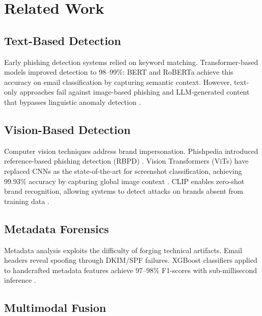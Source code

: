 \documentclass[conference]{IEEEtran}
\begin{document}
\section{Related Work}

\subsection{Text-Based Detection}

Early phishing detection systems relied on keyword matching. Transformer-based models improved detection to 98--99\%: BERT \cite{devlin_2019_bert} and RoBERTa \cite{liu_2019_roberta} achieve this accuracy on email classification by capturing semantic context. However, text-only approaches fail against image-based phishing and LLM-generated content that bypasses linguistic anomaly detection \cite{roy_2024_chatbots_phishbots}.

\subsection{Vision-Based Detection}

Computer vision techniques address brand impersonation. Phishpedia introduced reference-based phishing detection (RBPD) \cite{lin_2021_phishpedia}. Vision Transformers (ViTs) have replaced CNNs as the state-of-the-art for screenshot classification, achieving 99.93\% accuracy by capturing global image context \cite{dosovitskiy_2021_vit}. CLIP enables zero-shot brand recognition, allowing systems to detect attacks on brands absent from training data \cite{radford_2021_clip}.

\subsection{Metadata Forensics}

Metadata analysis exploits the difficulty of forging technical artifacts. Email headers reveal spoofing through DKIM/SPF failures. XGBoost classifiers applied to handcrafted metadata features achieve 97--98\% F1-scores with sub-millisecond inference \cite{chen_2016_xgboost}.

\subsection{Multimodal Fusion}
\end{document}
